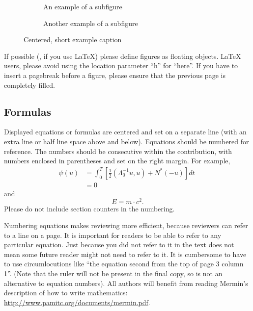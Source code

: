 \documentclass[runningheads]{llncs}
\begin{document}
\begin{figure}[tb]
  \centering
  \begin{subfigure}{0.68\linewidth}
    \fbox{\rule{0pt}{2in} \rule{.9\linewidth}{0pt}}
    \caption{An example of a subfigure}
    \label{fig:short-a}
  \end{subfigure}
  \hfill
  \begin{subfigure}{0.28\linewidth}
    \fbox{\rule{0pt}{2in} \rule{.9\linewidth}{0pt}}
    \caption{Another example of a subfigure}
    \label{fig:short-b}
  \end{subfigure}
  \caption{Centered, short example caption}
  \label{fig:short}
\end{figure}

If possible (\eg, if you use \LaTeX) please define figures as floating objects. 
\LaTeX{} users, please avoid using the location parameter ``h'' for ``here''. 
If you have to insert a pagebreak before a figure, please ensure that the previous page is completely filled.


\subsection{Formulas}
Displayed equations or formulas are centered and set on a separate line (with an extra line or half line space above and below). 
Equations should be numbered for reference. 
The numbers should be consecutive within the contribution, with numbers enclosed in parentheses and set on the right margin.
For example,
\begin{align}
  \psi (u) & = \int_{0}^{T} \left[\frac{1}{2}
  \left(\Lambda_{0}^{-1} u,u\right) + N^{\ast} (-u)\right] dt \; \\
& = 0
\end{align}
and 
\begin{equation}
  E = m\cdot c^2.
  \label{eq:important}
\end{equation}
Please do not include section counters in the numbering.

Numbering equations makes reviewing more efficient, because reviewers can refer to a line on a page.  
It is important for readers to be able to refer to any particular equation.
Just because you did not refer to it in the text does not mean some future reader might not need to refer to it.
It is cumbersome to have to use circumlocutions like ``the equation second from the top of page 3 column 1''.
(Note that the ruler will not be present in the final copy, so is not an alternative to equation numbers).
All authors will benefit from reading Mermin's description of how to write mathematics:
\url{http://www.pamitc.org/documents/mermin.pdf}.
\end{document}
